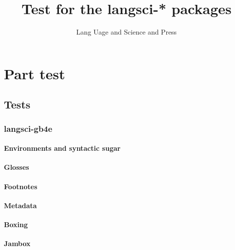 \documentclass[output=book
  ,colorlinks
  ,showindex
  ,tblseight
  ,nobabel
    ,booklanguage=spanish
  ]{langscibook}
\title{Test for the langsci-* packages}
\author{Lang Uage and Science and Press}
\begin{document}
\renewcommand{\lsImpressumExtra}{Manuscript submitted in fulfillment of entering the Galactical Hall of Fame.}


\maketitle
\tableofcontents
\mainmatter

%
\part{Part test}
\chapter{Tests}
\section{langsci-gb4e}
\subsection{Environments and syntactic sugar}












\subsection{Glosses}






\subsection{Footnotes}


% 
\subsection{Metadata}

\subsection{Boxing}

\subsection{Jambox}
% 
\end{document}
